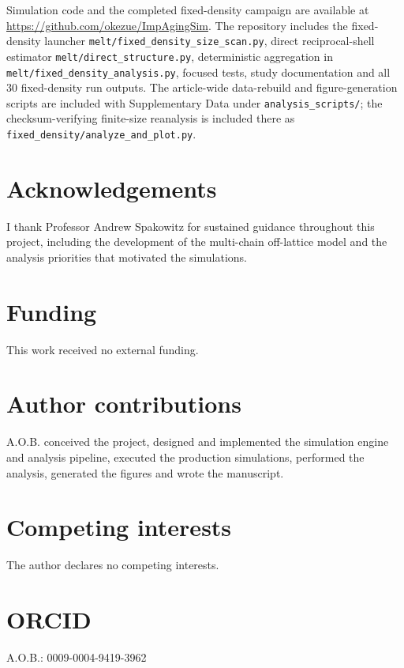 \documentclass[pdflatex,sn-nature,onecolumn]{sn-jnl}
\begin{document}
Simulation code and the completed fixed-density campaign are available at \url{https://github.com/okezue/ImpAgingSim}. The repository includes the fixed-density launcher \texttt{melt/fixed\_density\_size\_scan.py}, direct reciprocal-shell estimator \texttt{melt/direct\_structure.py}, deterministic aggregation in \texttt{melt/fixed\_density\_analysis.py}, focused tests, study documentation and all 30 fixed-density run outputs. The article-wide data-rebuild and figure-generation scripts are included with Supplementary Data under \texttt{analysis\_scripts/}; the checksum-verifying finite-size reanalysis is included there as \texttt{fixed\_density/analyze\_and\_plot.py}.

\section{Acknowledgements}

I thank Professor Andrew Spakowitz for sustained guidance throughout this project, including the development of the multi-chain off-lattice model and the analysis priorities that motivated the simulations.

\section{Funding}

This work received no external funding.

\section{Author contributions}

A.O.B. conceived the project, designed and implemented the simulation engine and analysis pipeline, executed the production simulations, performed the analysis, generated the figures and wrote the manuscript.

\section{Competing interests}

The author declares no competing interests.

\section*{ORCID}

A.O.B.: 0009-0004-9419-3962
\end{document}
